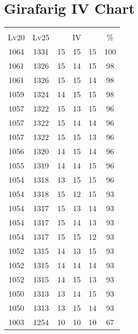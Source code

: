 \documentclass{article}%
\begin{document}
%
\normalsize%
\section{Girafarig IV Chart}%
\label{sec:Girafarig IV Chart}%
\renewcommand{\arraystretch}{1.5}%
\begin{tabular}{|c|c|c|c|c|c|}%
\hline%
\multicolumn{6}{|c|}{\textcolor{white}{ 
\linebreak{Girafarig}
}%
\cellcolor{black}}\\%
\multicolumn{1}{|c}{Lv20}&\multicolumn{1}{c|}{Lv25}&\multicolumn{3}{c|}{IV}&\multicolumn{1}{|c|}{\%}\\%
\hline%
\rowcolor{color100}%
1064&1331&15&15&15&100\\%
\hline%
\rowcolor{color98}%
1061&1326&15&14&15&98\\%
\hline%
\rowcolor{color98}%
1061&1326&15&15&14&98\\%
\hline%
\rowcolor{color98}%
1059&1324&14&15&15&98\\%
\hline%
\rowcolor{color96}%
1057&1322&15&13&15&96\\%
\hline%
\rowcolor{color96}%
1057&1322&15&14&14&96\\%
\hline%
\rowcolor{color96}%
1057&1322&15&15&13&96\\%
\hline%
\rowcolor{color96}%
1056&1320&14&15&14&96\\%
\hline%
\rowcolor{color96}%
1055&1319&14&14&15&96\\%
\hline%
\rowcolor{color96}%
1054&1318&13&15&15&96\\%
\hline%
\rowcolor{color93}%
1054&1318&15&12&15&93\\%
\hline%
\rowcolor{color93}%
1054&1317&15&13&14&93\\%
\hline%
\rowcolor{color93}%
1054&1317&15&14&13&93\\%
\hline%
\rowcolor{color93}%
1054&1317&15&15&12&93\\%
\hline%
\rowcolor{color93}%
1052&1315&14&13&15&93\\%
\hline%
\rowcolor{color93}%
1052&1315&14&14&14&93\\%
\hline%
\rowcolor{color93}%
1052&1315&14&15&13&93\\%
\hline%
\rowcolor{color93}%
1050&1313&13&14&15&93\\%
\hline%
\rowcolor{color93}%
1050&1313&13&15&14&93\\%
\hline%
\rowcolor{color91}%
1003&1254&10&10&10&67\\%
\end{tabular}

%
\end{document}
